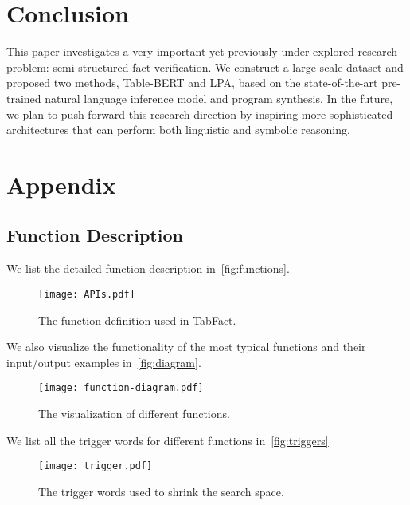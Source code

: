 \documentclass{article} \usepackage{iclr2020_conference,times}
\begin{document}
\section{Conclusion}
This paper investigates a very important yet previously under-explored research problem: semi-structured fact verification. We construct a large-scale dataset and proposed two methods, Table-BERT and LPA, based on the state-of-the-art pre-trained natural language inference model and program synthesis. In the future, we plan to push forward this research direction by inspiring more sophisticated architectures that can perform both linguistic and symbolic reasoning. 




\appendix
\clearpage
\section{Appendix}
\subsection{Function Description}
We list the detailed function description in~\autoref{fig:functions}.
\begin{figure}[htb]
    \centering
    \texttt{[image: APIs.pdf]}
    \caption{The function definition used in TabFact.}
    \label{fig:functions}
\end{figure}
We also visualize the functionality of the most typical functions and their input/output examples in~\autoref{fig:diagram}.
\begin{figure}[htb]
    \centering
    \texttt{[image: function-diagram.pdf]}
    \caption{The visualization of different functions.}
    \label{fig:diagram}
\end{figure}

We list all the trigger words for different functions in~\autoref{fig:triggers}
\begin{figure}[htb]
    \centering
    \texttt{[image: trigger.pdf]}
    \caption{The trigger words used to shrink the search space.}
    \label{fig:triggers}
\end{figure}
\end{document}
